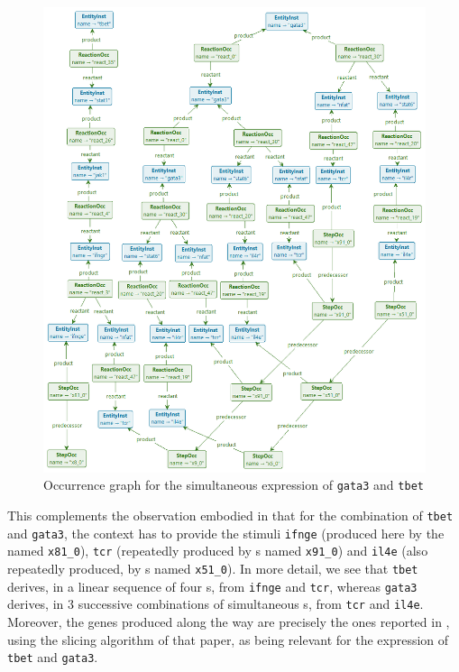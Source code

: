 \begin{figure}\centering
\includegraphics[scale=.25]{figs/datamod-pruned}
\caption{Occurrence graph for the simultaneous expression of \texttt{gata3} and \texttt{tbet}}
\label{fig:datamod-pruned}
\end{figure}

This complements the observation embodied in \cite[Fig.~8]{datamod2023} that for the combination of \texttt{tbet} and \texttt{gata3}, the context has to provide the stimuli \texttt{ifnge} (produced here by the \StepOcc named \texttt{x81\_0}), \texttt{tcr} (repeatedly produced by \StepOcc{}s named \texttt{x91\_0}) and \texttt{il4e} (also repeatedly produced, by \StepOcc{}s named \texttt{x51\_0}). In more detail, we see that \texttt{tbet} derives, in a linear sequence of four \ReactionOcc{}s, from \texttt{ifnge} and \texttt{tcr}, whereas \texttt{gata3} derives, in 3 successive combinations of simultaneous \ReactionOcc{}s, from \texttt{tcr} and \texttt{il4e}. Moreover, the genes produced along the way are precisely the ones reported in \cite[Fig.~9]{datamod2023}, using the slicing algorithm of that paper, as being relevant for the expression of \texttt{tbet} and \texttt{gata3}.

